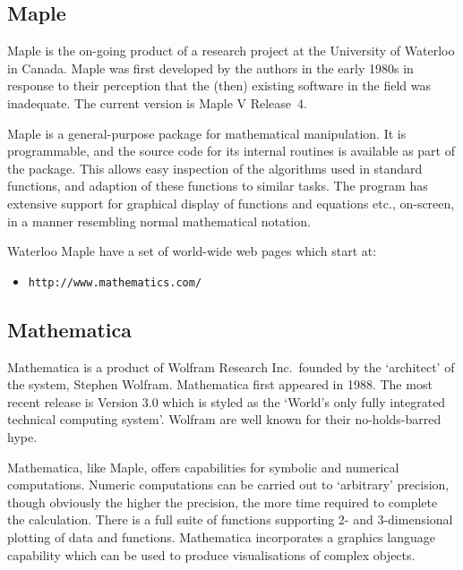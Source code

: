 \documentclass[twoside,11pt]{article}
\newcommand{\htmladdnormallink}[2]{#1}
\begin{document}
\subsection{Maple}

Maple is the on-going product of a research project at the University of
Waterloo in Canada.  Maple was first developed by the authors in the early
1980s in response to their perception that the (then) existing software in
the field was inadequate.
The current version is Maple V Release~4.

Maple is a general-purpose package for mathematical manipulation.
It is programmable, and the source code for its internal routines is
available as part of the package.
This allows easy inspection of the algorithms used in standard functions,
and adaption of these functions to similar tasks.
The program has extensive support for graphical display of functions and
equations etc., on-screen, in a manner resembling normal mathematical
notation.

Waterloo Maple have a set of world-wide web pages which start at:

\begin{itemize}

\item \htmladdnormallink{{\tt http://www.mathematics.com/}}
      {http://www.mathematics.com/}

\end{itemize}


\subsection{Mathematica}

Mathematica is a product of Wolfram Research Inc.\ founded by the
`architect' of the system, Stephen Wolfram.  Mathematica first appeared in
1988.  The most recent release is Version 3.0 which is styled as the
`World's only fully integrated technical computing system'.
Wolfram are well known for their no-holds-barred hype.

Mathematica, like Maple, offers capabilities for symbolic and numerical
computations.  Numeric computations can be carried out to `arbitrary'
precision, though obviously the higher the precision, the more time required
to complete the calculation.  There is a full suite of functions supporting
2- and 3-dimensional plotting of data and functions.  Mathematica
incorporates a graphics language capability which can be used to produce
visualisations of complex objects.
\end{document}
